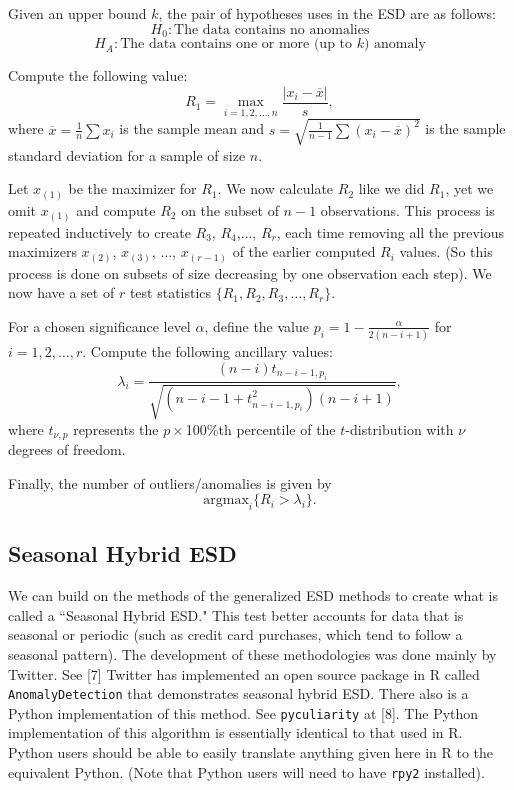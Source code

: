 \documentclass[12pt]{article}
\begin{document}
Given an upper bound $k$, the pair of hypotheses uses in the ESD are as follows:
\[H_0: \text{The data contains no anomalies}\]
\[H_A: \text{The data contains one or more (up to $k$) anomaly}\]

Compute the following value:
\[R_1 = \max_{i = 1,2,\ldots, n} \frac{|x_i - \overline{x}|}{s},\]
where $\overline{x} = \frac{1}{n}\sum x_i$ is the sample mean and $ s= \sqrt{\frac{1}{n-1}\sum (x_i- \overline{x})^2}$ is the sample standard deviation for a sample of size $n$.

Let $x_{(1)}$ be the maximizer for $R_1$.  We now calculate $R_2$ like we did $R_1$, yet we omit $x_{(1)}$ and compute $R_2$ on the subset of $n-1$ observations.
This process is repeated inductively to create $R_3$, $R_4$,$\ldots$, $R_r$, each time removing all the previous maximizers $x_{(2)}$, $x_{(3)}$, $\ldots$, $x_{(r-1)}$ of the earlier computed $R_i$ values. (So this process is done on subsets of size decreasing by one observation each step). 
We now have a set of $r$ test statistics $\{R_1, R_2, R_3, \ldots, R_r\}$. 

For a chosen significance level $\alpha$, define the value $p_i = 1-\frac{\alpha}{2(n-i+1)}$ for $i = 1,2,\ldots,r$. Compute the following ancillary values:
\[\lambda_i = \frac{(n-i)t_{n-i-1,p_i}}{\sqrt{(n - i -1 + t^2_{n-i -1, p_i})(n - i +1)}},\] where $t_{\nu, p}$ represents the $p \times $100\%th percentile of the $t$-distribution with $\nu$ degrees of freedom. 

Finally, the number of outliers/anomalies is given by \[\text{argmax}_{i} \{R_i > \lambda_i\}.\]


\subsection{Seasonal Hybrid ESD} We can build on the methods of the generalized ESD methods to create what is called a ``Seasonal Hybrid ESD." This test better accounts for data that is seasonal or periodic (such as credit card purchases, which tend to follow a seasonal pattern). The development of these methodologies was done mainly by Twitter. See [7] 
Twitter has implemented an open source package in R called \texttt{AnomalyDetection} that demonstrates seasonal hybrid ESD. There also is a Python implementation of this method. See \texttt{pyculiarity} at [8]. The Python implementation of this algorithm is essentially identical to that used in R. Python users should be able to easily translate anything given here in R to the equivalent Python. (Note that Python users will need to have \texttt{rpy2} installed). 
\end{document}
